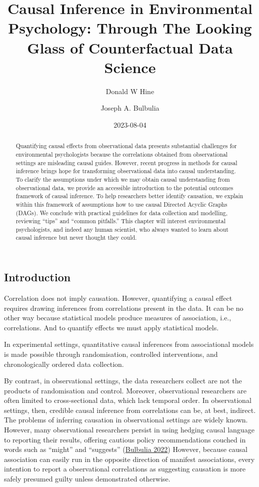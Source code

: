 \documentclass[
  singlecolumn]{article}
\title{Causal Inference in Environmental Psychology: Through The Looking
Glass of Counterfactual Data Science}
\author{Donald W Hine}
\affil{%
                  University of Canterbury, School of Psychology, Speech
                  and Hearing
              }
\author{Joseph A. Bulbulia}
\affil{%
                  Victoria University of Wellington, New Zealand, School
                  of Psychology, Centre for Applied Cross-Cultural
                  Research
              }
\date{2023-08-04}
\begin{document}
\maketitle
\begin{abstract}
Quantifying causal effects from observational data presents substantial
challenges for environmental psychologists because the correlations
obtained from observational settings are misleading causal guides.
However, recent progress in methods for causal inference brings hope for
transforming observational data into causal understanding. To clarify
the assumptions under which we may obtain causal understanding from
observational data, we provide an accessible introduction to the
potential outcomes framework of causal inference. To help researchers
better identify causation, we explain within this framework of
assumptions how to use causal Directed Acyclic Graphs (DAGs). We
conclude with practical guidelines for data collection and modelling,
reviewing ``tips'' and ``common pitfalls.'' This chapter will interest
environmental psychologists, and indeed any human scientist, who always
wanted to learn about causal inference but never thought they could.
\end{abstract}
\ifdefined\Shaded\renewenvironment{Shaded}{\begin{tcolorbox}[boxrule=0pt, frame hidden, enhanced, interior hidden, borderline west={3pt}{0pt}{shadecolor}, breakable, sharp corners]}{\end{tcolorbox}}\fi

\hypertarget{introduction}{%
\subsection{Introduction}\label{introduction}}

Correlation does not imply causation. However, quantifying a causal
effect requires drawing inferences from correlations present in the
data. It can be no other way because statistical models produce measures
of association, i.e., correlations. And to quantify effects we must
apply statistical models.

In experimental settings, quantitative causal inferences from
associational models is made possible through randomisation, controlled
interventions, and chronologically ordered data collection.

By contrast, in observational settings, the data researchers collect are
not the products of randomisation and control. Moreover, observational
researchers are often limited to cross-sectional data, which lack
temporal order. In observational settings, then, credible causal
inference from correlations can be, at best, indirect. The problems of
inferring causation in observational settings are widely known. However,
many observational researchers persist in using hedging causal language
to reporting their results, offering cautious policy recommendations
couched in words such as ``might'' and ``suggests''
(\protect\hyperlink{ref-bulbulia2022}{Bulbulia 2022}) However, because
causal association can easily run in the opposite direction of manifest
associations, every intention to report a observational correlations as
suggesting causation is more safely presumed guilty unless demonstrated
otherwise.
\end{document}
